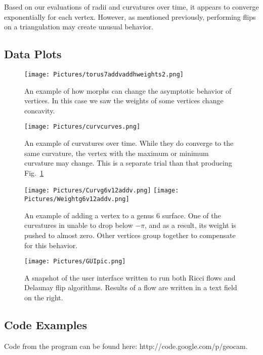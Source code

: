 \documentclass[12pt]{article}
\begin{document}
Based on our evaluations of radii and curvatures over time, it appears to converge exponentially for each vertex. However, as mentioned previously, performing flips on a triangulation may create unusual behavior.

\subsection{Data Plots}
\label{dataplots}

\begin{figure}[ht]
\centering
\texttt{[image: Pictures/torus7addvaddhweights2.png]}
\caption{An example of how morphs can change the asymptotic behavior of vertices. In this case we saw the weights of some vertices change concavity.}
\label{fig:t7vh}
\end{figure}

\begin{figure}
\centering
\texttt{[image: Pictures/curvcurves.png]}
\caption{An example of curvatures over time. While they do converge to the same curvature, the vertex with the maximum or minimum curvature may change. This is a separate trial than that producing Fig.~\ref{fig:t7vh}}
\end{figure}

\begin{figure}
\centering
\texttt{[image: Pictures/Curvg6v12addv.png]}
\texttt{[image: Pictures/Weightg6v12addv.png]}
\caption{An example of adding a vertex to a genus 6 surface. One of the curvatures in unable to drop below $-\pi$, and as a result, its weight is pushed to almost zero. Other vertices group together to compensate for this behavior.}
\end{figure}


\begin{figure}
\begin{center}
\texttt{[image: Pictures/GUIpic.png]}
\caption{A snapshot of the user interface written to run both Ricci flows and Delaunay flip algorithms. Results of a flow are written in a text field on the right.}
\end{center}
\end{figure}

\subsection{Code Examples}
Code from the program can be found here: http://code.google.com/p/geocam. 
 
\end{document}

